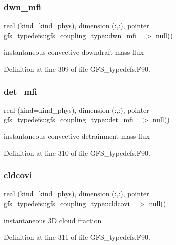 \subsubsection{dwn\+\_\+mfi}
{\footnotesize\ttfamily real (kind=kind\+\_\+phys), dimension (\+:,\+:), pointer gfs\+\_\+typedefs\+::gfs\+\_\+coupling\+\_\+type\+::dwn\+\_\+mfi =$>$ null()}



instantaneous convective downdraft mass flux 



Definition at line 309 of file G\+F\+S\+\_\+typedefs.\+F90.

\mbox{\label{structgfs__typedefs_1_1gfs__coupling__type_a6edde71526a3a4a580ef97cd1e4ecc2a}} 
\subsubsection{det\+\_\+mfi}
{\footnotesize\ttfamily real (kind=kind\+\_\+phys), dimension (\+:,\+:), pointer gfs\+\_\+typedefs\+::gfs\+\_\+coupling\+\_\+type\+::det\+\_\+mfi =$>$ null()}



instantaneous convective detrainment mass flux 



Definition at line 310 of file G\+F\+S\+\_\+typedefs.\+F90.

\mbox{\label{structgfs__typedefs_1_1gfs__coupling__type_a4256a8adb99ffad0cc6238822353e16a}} 
\subsubsection{cldcovi}
{\footnotesize\ttfamily real (kind=kind\+\_\+phys), dimension (\+:,\+:), pointer gfs\+\_\+typedefs\+::gfs\+\_\+coupling\+\_\+type\+::cldcovi =$>$ null()}



instantaneous 3D cloud fraction 



Definition at line 311 of file G\+F\+S\+\_\+typedefs.\+F90.

